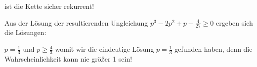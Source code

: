 \begin{uebsp}

{
ist die Kette sicher rekurrent!}



{
Aus der L\"osung der resultierenden Ungleichung 
$p^{3}-2p^{2}+p-\frac{4}{27}\ge 0$ ergeben sich die L\"osungen:}



{
 $p=\frac{1}{3}$ und  $p\ge \frac{4}{3}$  womit wir die eindeutige
L\"osung  $p=\frac{1}{3}$ gefunden haben, denn die Wahrscheinlichkeit
kann nie gr\"o{\ss}er 1 sein!}



%
\end{uebsp}

